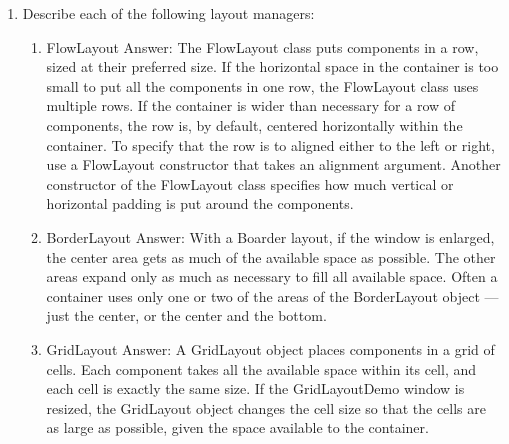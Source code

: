 \documentclass[11pt]{article}
\newenvironment{answer}{\large\lstset{basicstyle=\large\ttfamily}\color{white} \small{Answer:}}{}
\newenvironment{answer}{\large\lstset{basicstyle=\large\ttfamily}\color{red} \small{Answer:}}{}
\begin{document}
\begin{enumerate}
\newpage
\item Describe each of the following layout managers:
\begin{enumerate}
\item FlowLayout
\begin{answer}
The FlowLayout class puts components in a row, sized at their preferred size. If the horizontal space in the container is too small to put all the components in one row, the FlowLayout class uses multiple rows. If the container is wider than necessary for a row of components, the row is, by default, centered horizontally within the container. To specify that the row is to aligned either to the left or right, use a FlowLayout constructor that takes an alignment argument. Another constructor of the FlowLayout class specifies how much vertical or horizontal padding is put around the components. \end{answer}
\item BorderLayout
\begin{answer}
With a Boarder layout, if the window is enlarged, the center area gets as much of the available space as possible. The other areas expand only as much as necessary to fill all available space. Often a container uses only one or two of the areas of the BorderLayout object — just the center, or the center and the bottom. \end{answer}
\item GridLayout
\begin{answer}
A GridLayout object places components in a grid of cells. Each component takes all the available space within its cell, and each cell is exactly the same size. If the GridLayoutDemo window is resized, the GridLayout object changes the cell size so that the cells are as large as possible, given the space available to the container.\end{answer}
\end{enumerate}





\end{enumerate}
\end{document}
